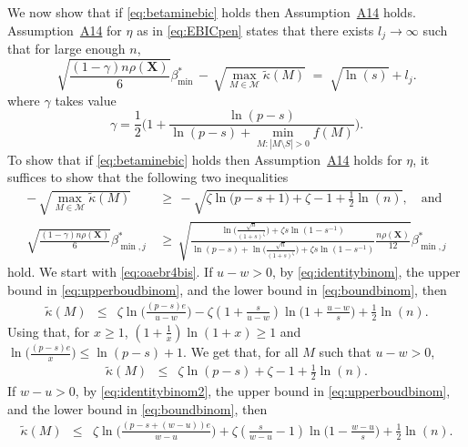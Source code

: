 \documentclass[bj,authoryear]{imsart}
\theoremstyle{plain}
\newcommand{\M}{\mathcal{M}}
\newcommand{\bs}{\boldsymbol}
\begin{document}
We now show that if \eqref{eq:betaminebic} holds then Assumption~\hyperlink{lab:A14}{A14} holds.
Assumption~\hyperlink{lab:A14}{A14} for $\eta$ as in \eqref{eq:EBICpen} states that there exists $l_j\to \infty$ such that for large enough $n$,
    \begin{equation*}
        \sqrt{\frac{(1-\gamma) n\rho(\bs X)}{6}}{{\beta_{\min}^*}} \,- \,\sqrt{\max_{M\in\M}\tilde{\kappa}(M)} \;=\; \sqrt{\ln(s)} + l_j .
    \end{equation*}
where $\gamma$ takes value
\begin{equation}\label{eq:gammaebic}
    \gamma=\frac12\Big(1+\frac{\ln(p-s)}{\ln(p-s)+\min_{M: |M\setminus S|>0}f(M)}\Big).
\end{equation}
To show that if \eqref{eq:betaminebic} holds then Assumption~\hyperlink{lab:A14}{A14} holds for $\eta$, it suffices to show that the following two inequalities
\begin{align}
    - \,\sqrt{\max_{M\in\M}\tilde{\kappa}(M)} \,&\geq \,-\sqrt{\zeta\ln\big(p-s+1\big)+\zeta-1+\frac{1}{2}\ln(n)}\label{eq:oaebr4bis},\quad\text{and} \\
    \sqrt{\frac{ (1-\gamma)n\rho(\bs X)}{6}}{\beta_{\min,j}^*} \,&\geq \,  \sqrt{\frac{ \ln \big(\tfrac{\sqrt{n}}{(1+s)^{\zeta}}\big)+\zeta s\ln(1-s^{-1})}{\ln(p-s)+ \ln \big(\tfrac{\sqrt{n}}{(1+s)^{\zeta}}\big)+\zeta s\ln(1-s^{-1})}\frac{ n\rho(\bs X)}{12}}{\beta_{\min,j}^*} \label{eq:oaebr3bis}
\end{align}
hold. We start with \eqref{eq:oaebr4bis}. If $u-w>0$, by \eqref{eq:identitybinom}, the upper bound in \eqref{eq:upperboudbinom}, and the lower bound in \eqref{eq:boundbinom}, then
 \begin{eqnarray*}
     \tilde{\kappa}(M) &\leq& \zeta\ln\Big(\frac{(p-s)e}{u-w}\Big)-\zeta(1+\frac{s}{u-w})\ln\Big(1+\frac{u-w}{s}\Big)+\frac{1}{2}\ln(n).
 \end{eqnarray*}
 Using that, for $x\geq1$, $(1+\frac{1}{x})\ln(1+x)\geq 1$ and $\ln\big(\frac{(p-s)e}{x}\big)\leq \ln(p-s)+1$. We get that, for all $M$ such that $u-w>0$, 
  \begin{eqnarray}\label{eq:pifr} 
     \tilde{\kappa}(M) &\leq& \zeta\ln(p-s)+\zeta-1+\frac{1}{2}\ln(n).
 \end{eqnarray}
If $w-u>0$, by \eqref{eq:identitybinom2}, the upper bound in \eqref{eq:upperboudbinom}, and the lower bound in \eqref{eq:boundbinom}, then
 \begin{eqnarray*}
     \tilde{\kappa}(M) &\leq& 
     \zeta\ln\Big(\frac{(p-s+(w-u))e}{w-u}\Big)+\zeta(\frac{s}{w-u}-1)\ln\Big(1
     -\frac{w-u}{s}\Big)+\frac{1}{2}\ln(n).
 \end{eqnarray*}
\end{document}
